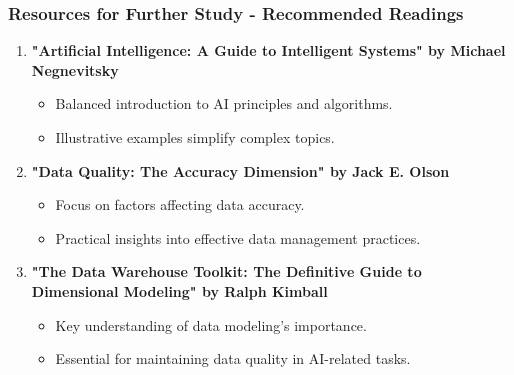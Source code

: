 \documentclass[aspectratio=169]{beamer}
\begin{document}
\begin{frame}[fragile]
    \frametitle{Resources for Further Study - Recommended Readings}
    \begin{enumerate}
        \item \textbf{"Artificial Intelligence: A Guide to Intelligent Systems" by Michael Negnevitsky}
        \begin{itemize}
            \item Balanced introduction to AI principles and algorithms.
            \item Illustrative examples simplify complex topics.
        \end{itemize}
        
        \item \textbf{"Data Quality: The Accuracy Dimension" by Jack E. Olson}
        \begin{itemize}
            \item Focus on factors affecting data accuracy.
            \item Practical insights into effective data management practices.
        \end{itemize}
        
        \item \textbf{"The Data Warehouse Toolkit: The Definitive Guide to Dimensional Modeling" by Ralph Kimball}
        \begin{itemize}
            \item Key understanding of data modeling's importance.
            \item Essential for maintaining data quality in AI-related tasks.
        \end{itemize}
    \end{enumerate}
\end{frame}
\end{document}
